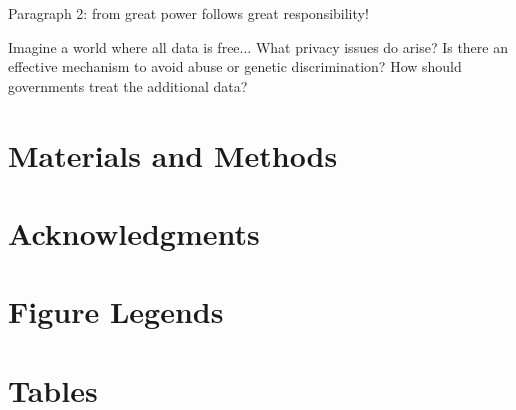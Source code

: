 \documentclass[10pt]{article}
\begin{document}
Paragraph 2:
from great power follows great responsibility!

Imagine a world where all data is free...
What privacy issues do arise? 
Is there an effective mechanism to avoid abuse or
genetic discrimination?
How should governments treat the additional  data?


\section*{Materials and Methods}

\section*{Acknowledgments}




\section*{Figure Legends}


\section*{Tables}
\end{document}
